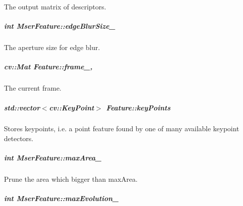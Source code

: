 The output matrix of descriptors. 

\hypertarget{group___feature_extractor_a1850b5af2915831475ef9d776e8a72ea}{
\subparagraph[{edge\-Blur\-Size\-\_\-}]{\setlength{\rightskip}{0pt plus 5cm}int Mser\-Feature\-::edge\-Blur\-Size\-\_\-\hspace{0.3cm}{\ttfamily [private]}}}\label{group___feature_extractor_a1850b5af2915831475ef9d776e8a72ea}


The aperture size for edge blur. 

\hypertarget{group___feature_extractor_aa805e6fee8eeec2061feabe29430f0df}{
\subparagraph[{frame\-\_\-}]{\setlength{\rightskip}{0pt plus 5cm}cv\-::\-Mat Feature\-::frame\-\_\-\hspace{0.3cm}{\ttfamily [protected]}, {\ttfamily [inherited]}}}\label{group___feature_extractor_aa805e6fee8eeec2061feabe29430f0df}


The current frame. 

\hypertarget{group___feature_extractor_ac666ae973c3840be1b3b9183dd12b8c1}{
\subparagraph[{key\-Points}]{\setlength{\rightskip}{0pt plus 5cm}std\-::vector$<$cv\-::\-Key\-Point$>$ Feature\-::key\-Points\hspace{0.3cm}{\ttfamily [inherited]}}}\label{group___feature_extractor_ac666ae973c3840be1b3b9183dd12b8c1}


Stores keypoints, i.\-e. a point feature found by one of many available keypoint detectors. 

\hypertarget{group___feature_extractor_a74d77b8596474323f1c4581ddf1d7fa2}{
\subparagraph[{max\-Area\-\_\-}]{\setlength{\rightskip}{0pt plus 5cm}int Mser\-Feature\-::max\-Area\-\_\-\hspace{0.3cm}{\ttfamily [private]}}}\label{group___feature_extractor_a74d77b8596474323f1c4581ddf1d7fa2}


Prune the area which bigger than max\-Area. 

\hypertarget{group___feature_extractor_a135d54a9a46522e800ef26ecfb8f18be}{
\subparagraph[{max\-Evolution\-\_\-}]{\setlength{\rightskip}{0pt plus 5cm}int Mser\-Feature\-::max\-Evolution\-\_\-\hspace{0.3cm}{\ttfamily [private]}}}\label{group___feature_extractor_a135d54a9a46522e800ef26ecfb8f18be}



